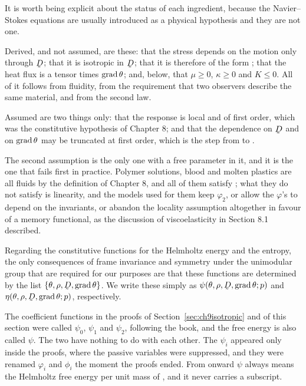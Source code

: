 \begin{remark}
\label{rem:ch9NSderived}
It is worth being explicit about the status of each ingredient, because
the Navier--Stokes equations are usually introduced as a physical
hypothesis and they are not one.

Derived, and not assumed, are these: that the stress depends on the
motion only through $\bD$; that it is isotropic in $\bD$; that it is
therefore of the form ; that the heat flux is a tensor times
$\operatorname{grad}\theta$; and, below, that $\mu\geq0$, $\kappa\geq0$ and $K\leq0$.
All of it follows from fluidity, from the requirement that two observers
describe the same material, and from the second law.

Assumed are two things only: that the response is local and of first
order, which was the constitutive hypothesis of Chapter 8; and that the
dependence on $\bD$ and on $\operatorname{grad}\theta$ may be truncated at first
order, which is the step from  to .

The second assumption is the only one with a free parameter in it, and
it is the one that fails first in practice. Polymer solutions, blood and
molten plastics are all fluids by the definition of Chapter 8, and all
of them satisfy ; what they do not satisfy is linearity, and
the models used for them keep $\varphi_{2}$, or allow the $\varphi$'s to
depend on the invariants, or abandon the locality assumption altogether
in favour of a memory functional, as the discussion of viscoelasticity
in Section 8.1 described.
\end{remark}

Regarding the constitutive functions for the Helmholtz energy and the
entropy, the only consequences of frame invariance and symmetry under
the unimodular group that are required for our purposes are that these
functions are determined by the list
$\{\theta,\rho,\bD,\grad\theta\}$. We write these simply as
$\psi(\theta,\rho,\bD,\grad\theta;p)$ and
$\eta(\theta,\rho,\bD,\grad\theta;p)$, respectively.

\begin{remark}\label{rem:ch9psi}
The coefficient functions in the proofs of
Section~\ref{sec:ch9isotropic} and of this section were called
$\psi_{0}$, $\psi_{1}$ and $\psi_{2}$, following the book, and the free energy is
also called $\psi$. The two have nothing to do with each other. The
$\psi_{i}$ appeared only inside the proofs, where the passive variables
were suppressed, and they were renamed $\varphi_{i}$ and $\phi_{i}$ the
moment the proofs ended. From  onward $\psi$ always means the
Helmholtz free energy per unit mass of , and it never carries
a subscript.
\end{remark}
